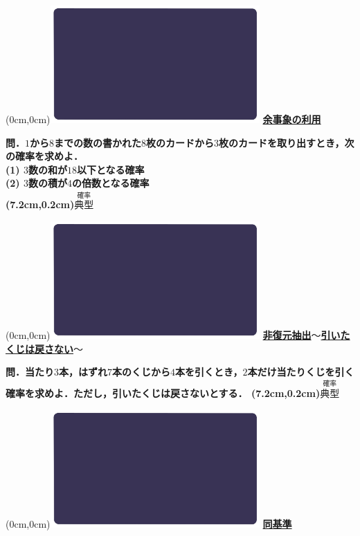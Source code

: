 \documentclass[10pt,
fleqn,
dvipdfmx,
uplatex
]{jsarticle}
\begin{document}
\newpage



\at(0cm,0cm){\includegraphics[width=8cm,bb=0 0 1920 1080]{./youtube/thumbnails/templates/smart_background/確率.jpeg}}
{\color{orange}\bf\boldmath\huge\underline{余事象の利用}}\vspace{0.3zw}

\large 
\bf\boldmath 問．$1$から$8$までの数の書かれた$8$枚のカードから$3$枚のカードを取り出すとき，次の確率を求めよ．\\
(1)  $3$数の和が${18}$以下となる確率\\
(2)  $3$数の積が$4$の倍数となる確率\\

\at(7.2cm,0.2cm){\small\color{bradorange}$\overset{\text{確率}}{\text{典型}}$}


\newpage



\at(0cm,0cm){\includegraphics[width=8cm,bb=0 0 1920 1080]{./youtube/thumbnails/templates/smart_background/確率.jpeg}}
{\color{orange}\bf\boldmath\large\underline{非復元抽出$〜$引いたくじは戻さない$〜$}}\vspace{0.3zw}

\Large 
\bf\boldmath 問．当たり$3$本，はずれ$7$本のくじから$4$本を引くとき，$2$本だけ当たりくじを引く確率を求めよ．ただし，引いたくじは戻さないとする．
\at(7.2cm,0.2cm){\small\color{bradorange}$\overset{\text{確率}}{\text{典型}}$}


\newpage



\at(0cm,0cm){\includegraphics[width=8cm,bb=0 0 1920 1080]{./youtube/thumbnails/templates/smart_background/確率.jpeg}}
{\color{orange}\bf\boldmath\huge\underline{同基準}}\vspace{0.3zw}
\end{document}
